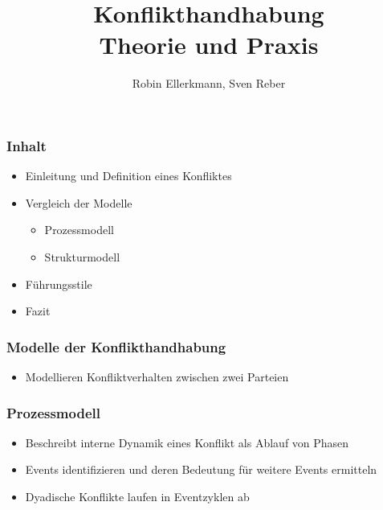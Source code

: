 \documentclass[12pt,a4paper]{beamer}
\author{Robin Ellerkmann, Sven Reber}
\title{Konflikthandhabung\\Theorie und Praxis}
\begin{document}
\maketitle

\begin{frame}
	\frametitle{Inhalt}
	
	\begin{itemize}
		\item Einleitung und Definition eines Konfliktes		%
		\item Vergleich der Modelle					%
		\begin{itemize}
			\item Prozessmodell
			\item Strukturmodell
		\end{itemize}
		\item F\"uhrungsstile							%
		\item Fazit									%
	\end{itemize}
\end{frame}

\begin{frame}
	\frametitle{Modelle der Konflikthandhabung}
	\begin{itemize}
		\item Modellieren Konfliktverhalten zwischen zwei Parteien
	\end{itemize}
\end{frame}

\begin{frame}
	\frametitle{Prozessmodell}
	\begin{itemize}
		\item Beschreibt interne Dynamik eines Konflikt als Ablauf von Phasen
		\item Events identifizieren und deren Bedeutung für weitere Events ermitteln
		\item Dyadische Konflikte laufen in Eventzyklen ab
	\end{itemize}
\end{frame}
\end{document}
